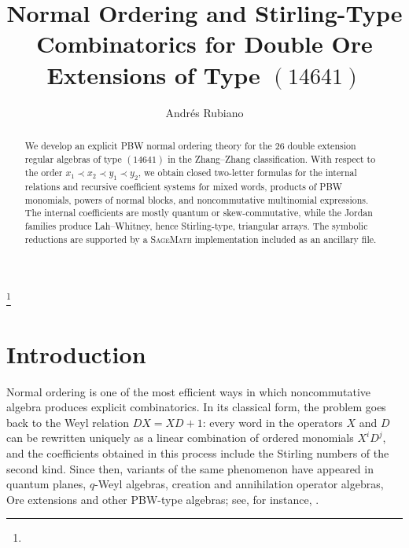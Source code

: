 \documentclass{amsart}
\theoremstyle{definition}
\theoremstyle{remark}
\numberwithin{equation}{section}
\begin{document}
\title[Normal ordering for double Ore extensions]{Normal Ordering and Stirling-Type Combinatorics for Double Ore Extensions of Type $(14641)$}


\author{Andr\'es Rubiano}
\address{Universidad Distrital Francisco Jos\'e de Caldas}
\address{Universidad ECCI}
\thanks{}



\date{}


\begin{abstract}
We develop an explicit PBW normal ordering theory for the $26$ double extension regular algebras of type $(14641)$ in the Zhang--Zhang classification. With respect to the order $x_1\prec x_2\prec y_1\prec y_2$, we obtain closed two-letter formulas for the internal relations and recursive coefficient systems for mixed words, products of PBW monomials, powers of normal blocks, and noncommutative multinomial expressions. The internal coefficients are mostly quantum or skew-commutative, while the Jordan families produce Lah--Whitney, hence Stirling-type, triangular arrays. The symbolic reductions are supported by a \textsc{SageMath} implementation included as an ancillary file.
\end{abstract}

\maketitle



\section{Introduction}

Normal ordering is one of the most efficient ways in which noncommutative algebra produces explicit combinatorics. In its classical form, the problem goes back to the Weyl relation $DX=XD+1$: every word in the operators $X$ and $D$ can be rewritten uniquely as a linear combination of ordered monomials $X^iD^j$, and the coefficients obtained in this process include the Stirling numbers of the second kind. Since then, variants of the same phenomenon have appeared in quantum planes, $q$-Weyl algebras, creation and annihilation operator algebras, Ore extensions and other PBW-type algebras; see, for instance, \cite{Varvak2005,MansourSchork2015,Schork2021,BriandLopesRosas2020,MansourSchork2023}.
\end{document}
